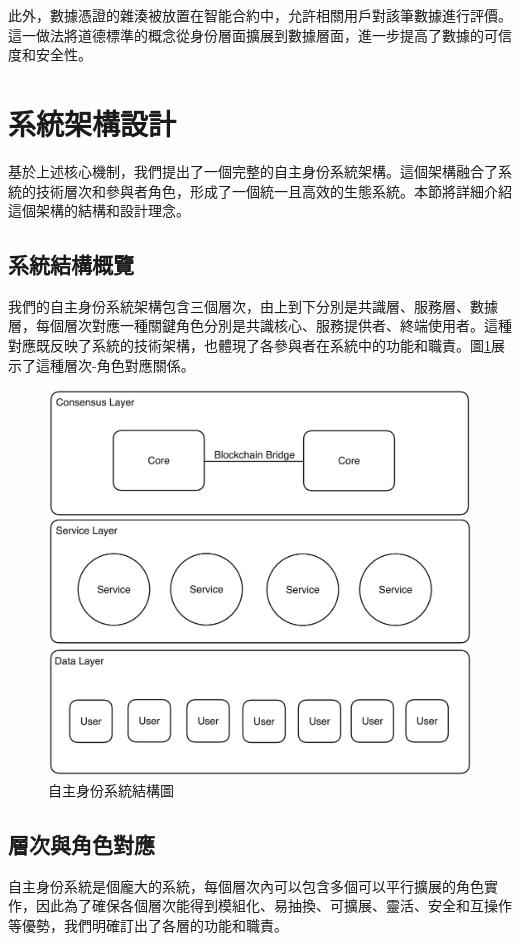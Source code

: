 此外，數據憑證的雜湊被放置在智能合約中，允許相關用戶對該筆數據進行評價。這一做法將道德標準的概念從身份層面擴展到數據層面，進一步提高了數據的可信度和安全性。
\section{系統架構設計}
基於上述核心機制，我們提出了一個完整的自主身份系統架構。這個架構融合了系統的技術層次和參與者角色，形成了一個統一且高效的生態系統。本節將詳細介紹這個架構的結構和設計理念。
\subsection{系統結構概覽}
我們的自主身份系統架構包含三個層次，由上到下分別是共識層、服務層、數據層，每個層次對應一種關鍵角色分別是共識核心、服務提供者、終端使用者。這種對應既反映了系統的技術架構，也體現了各參與者在系統中的功能和職責。圖\ref{fig:aid-system-layer}展示了這種層次-角色對應關係。
\begin{figure}[h]
  \centering
  \includegraphics[width=\linewidth,keepaspectratio]{figures/aidLayers.png}
  \caption{自主身份系統結構圖}
  \label{fig:aid-system-layer}
\end{figure}
\subsection{層次與角色對應}
自主身份系統是個龐大的系統，每個層次內可以包含多個可以平行擴展的角色實作，因此為了確保各個層次能得到模組化、易抽換、可擴展、靈活、安全和互操作等優勢，我們明確訂出了各層的功能和職責。
